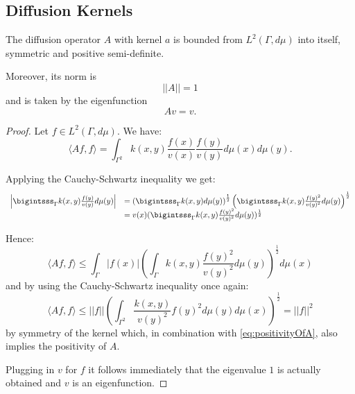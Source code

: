 \subsection{Diffusion Kernels}
\begin{theorem}
The diffusion operator $A$ with kernel $a$ is bounded from $L^2(\Gamma, d\mu)$ into itself, symmetric and positive semi-definite.

Moreover, its norm is $$||A||=1$$ and is taken by the eigenfunction $$Av=v.$$
\end{theorem}
\begin{proof}
Let $f\in L^2(\Gamma, d\mu)$. We have:
\begin{equation}\label{eq:positivityOfA}
\langle Af,f \rangle = \int_{\Gamma^2}k(x,y)\frac{f(x)}{v(x)}\frac{f(y)}{v(y)}d\mu(x)d\mu(y).
\end{equation}

Applying the Cauchy-Schwartz inequality we get:
\begin{equation*}\begin{array}{l l}
\left|\bigintsss_\Gamma k(x,y)\frac{f(y)}{v(y)}d\mu(y)\right| &= 
\left(\bigintsss_\Gamma k(x,y)d\mu(y)\right)^{\frac{1}{2}}
\left(\bigintsss_\Gamma k(x,y)\frac{f(y)^2}{v(y)^2} d\mu(y)\right)^{\frac{1}{2}} \\
&=v(x)(\bigintsss_\Gamma k(x,y)\frac{f(y)^2}{v(y)^2} d\mu(y))^{\frac{1}{2}}
\end{array}\end{equation*}

Hence:
$$\langle Af,f \rangle \leq \int_\Gamma |f(x)|\left(\int_\Gamma k(x,y)\frac{f(y)^2}{v(y)^2} d\mu(y)\right)^{\frac{1}{2}}d\mu(x)$$
and by using the Cauchy-Schwartz inequality once again:
$$\langle Af,f \rangle \leq ||f||\left(\int_{\Gamma^2} \frac{k(x,y)}{v(y)^2}f(y)^2 d\mu(y)d\mu(x)\right)^{\frac{1}{2}} = ||f||^2$$ by symmetry of the kernel which, in combination with \eqref{eq:positivityOfA}, also implies the positivity of $A$.

Plugging in $v$ for $f$ it follows immediately that the eigenvalue $1$ is actually obtained and $v$ is an eigenfunction.
\end{proof}

